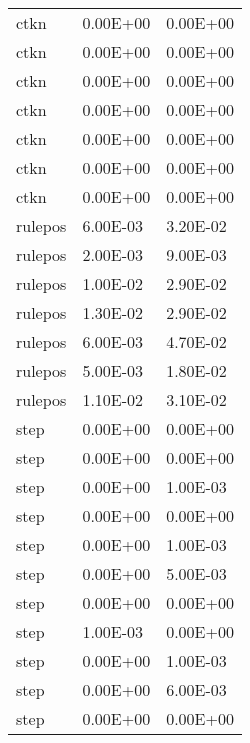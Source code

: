\begin{appendices}
\begin{center}
\begin{longtable}{|l|l|l|}
ctkn                          & 0.00E+00      & 0.00E+00        \\
ctkn                          & 0.00E+00      & 0.00E+00        \\
ctkn                          & 0.00E+00      & 0.00E+00        \\
ctkn                          & 0.00E+00      & 0.00E+00        \\
ctkn                          & 0.00E+00      & 0.00E+00        \\
ctkn                          & 0.00E+00      & 0.00E+00        \\
ctkn                          & 0.00E+00      & 0.00E+00        \\
rulepos                       & 6.00E-03      & 3.20E-02        \\
rulepos                       & 2.00E-03      & 9.00E-03        \\
rulepos                       & 1.00E-02      & 2.90E-02        \\
rulepos                       & 1.30E-02      & 2.90E-02        \\
rulepos                       & 6.00E-03      & 4.70E-02        \\
rulepos                       & 5.00E-03      & 1.80E-02        \\
rulepos                       & 1.10E-02      & 3.10E-02        \\
step                          & 0.00E+00      & 0.00E+00        \\
step                          & 0.00E+00      & 0.00E+00        \\
step                          & 0.00E+00      & 1.00E-03        \\
step                          & 0.00E+00      & 0.00E+00        \\
step                          & 0.00E+00      & 1.00E-03        \\
step                          & 0.00E+00      & 5.00E-03        \\
step                          & 0.00E+00      & 0.00E+00        \\
step                          & 1.00E-03      & 0.00E+00        \\
step                          & 0.00E+00      & 1.00E-03        \\
step                          & 0.00E+00      & 6.00E-03        \\
step                          & 0.00E+00      & 0.00E+00        \\

\end{longtable}
\end{center}
\end{appendices}
